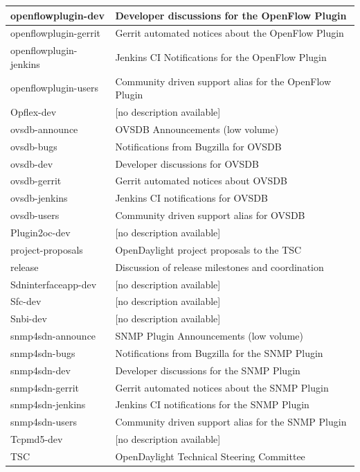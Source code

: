 \documentclass[a4paper, 12pt]{book}
\begin{document}
{\begin{longtable}{|p{4cm}|p{10cm}|}
openflowplugin-dev &	Developer discussions for the OpenFlow Plugin \\ \hline
openflowplugin-gerrit &	Gerrit automated notices about the OpenFlow Plugin \\ \hline
openflowplugin-jenkins &	Jenkins CI Notifications for the OpenFlow Plugin \\ \hline
openflowplugin-users &	Community driven support alias for the OpenFlow Plugin \\ \hline
Opflex-dev &	[no description available] \\ \hline
ovsdb-announce &	OVSDB Announcements (low volume) \\ \hline
ovsdb-bugs &	Notifications from Bugzilla for OVSDB \\ \hline
ovsdb-dev &	Developer discussions for OVSDB \\ \hline
ovsdb-gerrit &	Gerrit automated notices about OVSDB \\ \hline
ovsdb-jenkins &	Jenkins CI notifications for OVSDB \\ \hline
ovsdb-users &	Community driven support alias for OVSDB \\ \hline
Plugin2oc-dev &	[no description available] \\ \hline
project-proposals &	OpenDaylight project proposals to the TSC \\ \hline
release &	Discussion of release milestones and coordination \\ \hline
Sdninterfaceapp-dev &	[no description available] \\ \hline
Sfc-dev &	[no description available] \\ \hline
Snbi-dev &	[no description available] \\ \hline
snmp4sdn-announce &	SNMP Plugin Announcements (low volume) \\ \hline
snmp4sdn-bugs &	Notifications from Bugzilla for the SNMP Plugin \\ \hline
snmp4sdn-dev &	Developer discussions for the SNMP Plugin \\ \hline
snmp4sdn-gerrit &	Gerrit automated notices about the SNMP Plugin \\ \hline
snmp4sdn-jenkins &	Jenkins CI notifications for the SNMP Plugin \\ \hline
snmp4sdn-users &	Community driven support alias for the SNMP Plugin \\ \hline
Tcpmd5-dev &	[no description available] \\ \hline
TSC &	OpenDaylight Technical Steering Committee \\ \hline

\end{longtable}}
\end{document}
